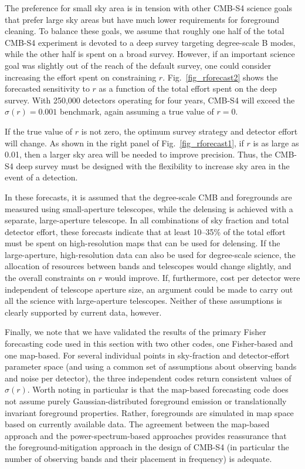 The preference for small sky area is in tension with other CMB-S4 science goals that prefer large sky areas but have much lower requirements for foreground cleaning.
To balance these goals, we assume that roughly one half of the total CMB-S4 experiment is devoted to a deep survey targeting degree-scale B modes, while the other half is spent on a broad survey.
However, if an important science goal was slightly out of the reach of the default survey, one could consider increasing the effort spent on constraining $r$.
Fig.~\ref{fig_rforecast2} shows the forecasted sensitivity to $r$ as a function of the total effort spent on the deep survey.
With 250,000 detectors operating for four years, CMB-S4 will exceed the $\sigma(r)=0.001$ benchmark, again assuming a true value of $r=0$.

If the true value of $r$ is not zero, the optimum survey strategy and detector effort will change.
As shown in the right panel of Fig.~\ref{fig_rforecast1}, if $r$ is as large as 0.01, then a larger sky area will be needed to improve precision. Thus, the CMB-S4 deep survey must be designed with the flexibility to increase sky area in the event of a detection.

In these forecasts, it is assumed that the degree-scale CMB and foregrounds are measured using small-aperture telescopes, while the delensing is achieved with a separate, large-aperture telescope. 
In all combinations of sky fraction and total detector effort, these forecasts indicate that at least 10--35\% of the total effort must be spent on high-resolution maps that can be used for delensing.
If the large-aperture, high-resolution data can also be used for degree-scale science, the allocation of resources between bands and telescopes would change slightly, and the overall constraints on $r$ would improve. 
If, furthermore, cost per detector were independent of telescope aperture size, an argument could be made to carry out all the science with large-aperture telescopes. 
Neither of these assumptions is clearly supported by current data, however.

Finally, we note that we have validated the results of the primary Fisher forecasting code used in this section with two other codes, one Fisher-based and one map-based. 
For several individual points in sky-fraction and detector-effort parameter space (and using a common set of assumptions about observing bands and noise per detector), the three independent codes return consistent values of $\sigma(r)$.
Worth noting in particular is that the map-based forecasting code does not assume purely Gaussian-distributed foreground emission or translationally invariant foreground properties. Rather, foregrounds are simulated in map space based on currently available data.
The agreement between the map-based approach and the power-spectrum-based approaches provides reassurance that the foreground-mitigation approach in the design of CMB-S4 (in particular the number of observing bands and their placement in frequency) is adequate.



